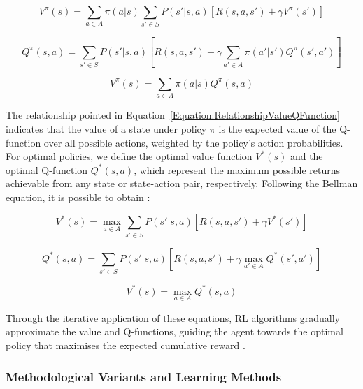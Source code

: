 \begin{equation}
V^\pi(s) = \sum_{a \in A} \pi(a|s) \sum_{s' \in S} P(s'|s,a) \left[ R(s,a,s') + \gamma V^\pi(s') \right]
\end{equation}

\begin{equation}
Q^\pi(s, a) = \sum_{s' \in S} P(s'|s,a) \left[ R(s,a,s') + \gamma \sum_{a' \in A} \pi(a'|s') Q^\pi(s', a') \right]
\end{equation}

\begin{equation}
\label{Equation:RelationshipValueQFunction}
V^\pi(s) = \sum_{a \in A} \pi(a|s) Q^\pi(s, a)
\end{equation}

The relationship pointed in Equation~\ref{Equation:RelationshipValueQFunction} indicates that the value of a state under policy \(\pi\) is the expected value of the Q-function over all possible actions, weighted by the policy's action probabilities. For optimal policies, we define the optimal value function \( V^*(s) \) and the optimal Q-function \( Q^*(s, a) \), which represent the maximum possible returns achievable from any state or state-action pair, respectively. Following the Bellman equation, it is possible to obtain \cite{sutton_reinforcement_2018}:

\begin{equation}
V^*(s) = \max_{a \in A} \sum_{s' \in S} P(s'|s,a) \left[ R(s,a,s') + \gamma V^*(s') \right]
\end{equation}

\begin{equation}
Q^*(s, a) = \sum_{s' \in S} P(s'|s,a) \left[ R(s,a,s') + \gamma \max_{a' \in A} Q^*(s', a') \right]
\end{equation}

\begin{equation}
V^*(s) = \max_{a \in A} Q^*(s, a)
\end{equation}

Through the iterative application of these equations, RL algorithms gradually approximate the value and Q-functions, guiding the agent towards the optimal policy that maximises the expected cumulative reward \cite{sutton_reinforcement_2018}.

\subsubsection{Methodological Variants and Learning Methods}

